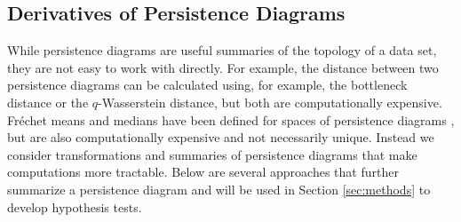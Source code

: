 \documentclass[12pt]{article}
\newcommand{\brittany}[1]{{\color{cyan} Brittany says: #1}}
\newcommand{\figref}[1]{Figure~\ref{#1}}
\def\R{{\mathbb R}}
\begin{document}
%

\subsection{Derivatives of Persistence Diagrams} \label{sec:derivatives}
While persistence diagrams are useful summaries of the topology of a data set, they are not easy to work with directly.
For example, the distance between two persistence diagrams can be calculated using, for example,  the bottleneck distance or the $q$-Wasserstein distance, but both are computationally expensive.
Fr\'echet means and medians have been defined for spaces of persistence diagrams \citep{Turner:2014kq}, but are also computationally expensive and not necessarily unique.  Instead we consider transformations and summaries of persistence diagrams that make computations more tractable.
Below are several approaches that further summarize a persistence diagram and will be used in Section \ref{sec:methods} to develop hypothesis tests.
\end{document}
